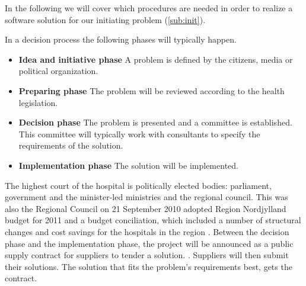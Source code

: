 In the following we will cover which procedures are needed in order to realize a software solution for our initiating problem (\cref{sub:init}).

In a decision process the following phases will typically happen. \cite{Sjaelland}


\begin{itemize}
  \setlength{\itemsep}{1pt}
  \setlength{\parskip}{0pt}
  \setlength{\parsep}{0pt}
	\item \textbf{Idea and initiative phase} A problem is defined by the citizens, media or political organization.
	\item \textbf{Preparing phase} The problem will be reviewed according to the health legislation.
	\item \textbf{Decision phase} The problem is presented and a committee is established. This committee will typically work with consultants to specify the requirements of the solution.
	\item \textbf{Implementation phase} The solution will be implemented. 
\end{itemize}

The highest court of the hospital is politically elected bodies: parliament, government and the minister-led ministries and the regional council. This was also the Regional Council on 21 September 2010 adopted Region Nordjylland budget for 2011 and a budget conciliation, which included a number of structural changes and cost savings for the hospitals in the region \cite{politisk_styret_ca}. Between the decision phase and the implementation phase, the project will be announced as a public supply contract for suppliers to tender a solution. \cite{Union2004}. Suppliers will then submit their solutions. The solution that fits the problem's requirements best, gets the contract. 
